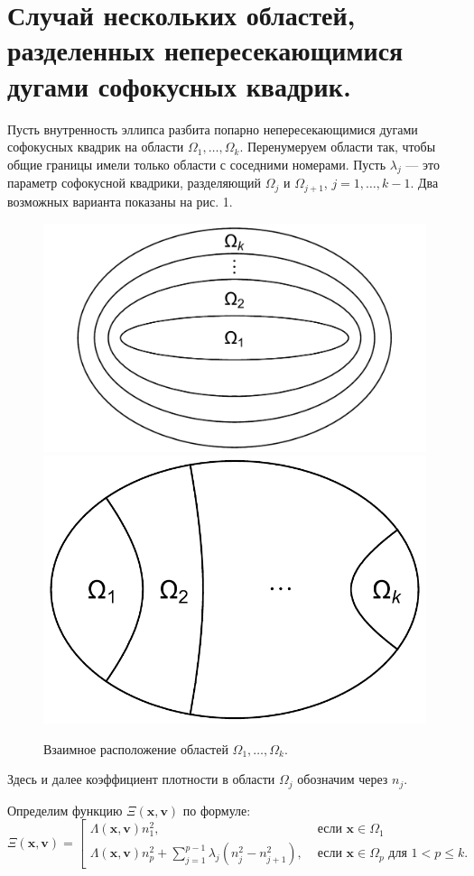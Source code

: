 \section{Случай нескольких областей, разделенных непересекающимися дугами софокусных квадрик.}
Пусть внутренность эллипса разбита попарно непересекающимися дугами софокусных квадрик на области $\Omega_1, \ldots, \Omega_k$.  Перенумеруем области так, чтобы общие границы имели только области с соседними номерами. Пусть $\lambda_j$ --- это параметр софокусной квадрики, разделяющий $\Omega_j$ и $\Omega_{j+1}$, $j=1, \ldots, k-1$. Два возможных варианта показаны на рис. 1. 

\begin{figure}[ht]
    \begin{minipage}[b][][b]{\linewidth}\centering
        \includegraphics[width=0.35\linewidth]{images/ch3/multiple_ellipses.pdf}
        \includegraphics[width=0.29\linewidth]{images/ch3/multiple_hyperbolas.pdf}
    \end{minipage}
\caption{Взаимное расположение областей $\Omega_1, \ldots, \Omega_k$.}
\end{figure}

Здесь и далее коэффициент плотности в области $\Omega_j$ обозначим через $n_j$.

Определим функцию $\Xi(\mathbf{x}, \mathbf{v})$ по формуле: 
\begin{equation*}
\Xi(\mathbf{x}, \mathbf{v}) = \left[
\begin{array}{ll}
    \Lambda(\mathbf{x}, \mathbf{v}) n_1^2, &  \text{ если } \mathbf{x} \in \Omega_1 
    \\
    \Lambda(\mathbf{x}, \mathbf{v}) n_p^2 + 
    \sum_{j=1}^{p-1} \lambda_j(n_j^2-n_{j+1}^2), & \text{ если } \mathbf{x} \in \Omega_p \text{ для } 1 < p \leq k. 
\end{array}
\right.
\end{equation*}

